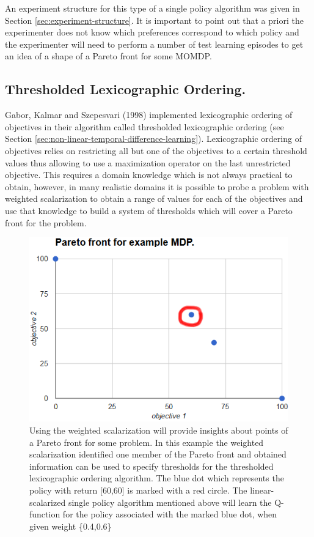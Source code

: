 An experiment structure for this type of a single policy algorithm was given in Section \ref{sec:experiment-structure}. It is important to point out that a priori the experimenter does not know which preferences correspond to which policy and the experimenter will need to perform a number of test learning episodes to get an idea of a shape of a Pareto front for some MOMDP.

\subsection{Thresholded Lexicographic Ordering.}
Gabor, Kalmar and Szepesvari (1998)\nocite{gabor1998multi} implemented lexicographic ordering of objectives in their algorithm called thresholded lexicographic ordering (see Section \ref{sec:non-linear-temporal-difference-learning}). Lexicographic ordering of objectives relies on restricting all but one of the objectives to a certain threshold values thus allowing to use a maximization operator on the last unrestricted objective. This requires a domain knowledge which is not always practical to obtain, however, in many realistic domains it is possible to probe a problem with weighted scalarization to obtain a range of values for each of the objectives and use that knowledge to build a system of thresholds which will cover a Pareto front for the problem.
\begin{figure}[ht]
\centering
\includegraphics[scale=0.6]{exampleMDPOneMarkedPolicy.png}
\caption{Using the weighted scalarization will provide insights about points of a Pareto front for some problem. In this example the weighted scalarization identified one member of the Pareto front and obtained information can be used to specify thresholds for the thresholded lexicographic ordering algorithm. The blue dot which represents the policy with return [60,60] is marked with a red circle. The linear-scalarized single policy algorithm mentioned above will learn the Q-function for the policy associated with the marked blue dot, when given weight \{0.4,0.6\}}
\label{fig:how-tlo-works}
\end{figure}

